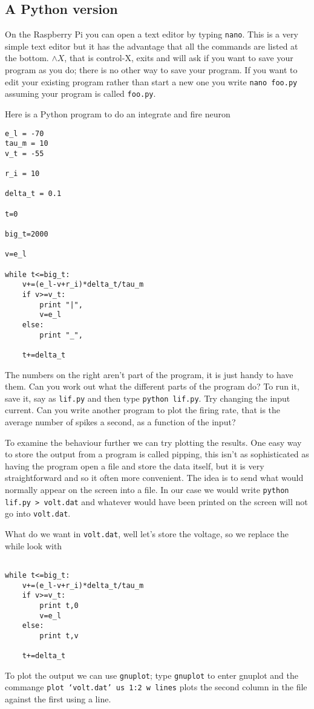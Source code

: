 \documentclass[11pt,a4paper]{scrartcl}
\begin{document}
\newpage

\subsection*{A Python version}

On the Raspberry Pi you can open a text editor by typing
\texttt{nano}. This is a very simple text editor but it has the
advantage that all the commands are listed at the bottom. $\wedge X$, that
is control-X, exits and will ask if you want to save your program as
you do; there is no other way to save your program. If you want to
edit your existing program rather than start a new one you write
\texttt{nano foo.py} assuming your program is called \texttt{foo.py}. 

Here is a Python program to do an integrate and fire neuron
\begin{lstlisting}[numbers=right]
e_l = -70
tau_m = 10
v_t = -55

r_i = 10

delta_t = 0.1

t=0

big_t=2000

v=e_l

while t<=big_t:
	v+=(e_l-v+r_i)*delta_t/tau_m
	if v>=v_t:
		print "|",
		v=e_l	
	else:
		print "_",

	t+=delta_t
\end{lstlisting}
The numbers on the right aren't part of the program, it is just handy
to have them. Can you work out what the different parts of the program
do? To run it, save it, say as \texttt{lif.py} and then type
\texttt{python lif.py}. Try changing the input current. Can you write
another program to plot the firing rate, that is the average number of
spikes a second, as a function of the input?

To examine the behaviour further we can try plotting the results. One
easy way to store the output from a program is called pipping, this
isn't as sophisticated as having the program open a file and store the
data itself, but it is very straightforward and so it often more
convenient. The idea is to send what would normally appear on the
screen into a file. In our case we would write \texttt{python lif.py >
  volt.dat} and whatever would have been printed on the screen will
not go into \texttt{volt.dat}. 

What do we want in \texttt{volt.dat}, well let's store the voltage, so we replace the while look with
\begin{lstlisting}[numbers=right]

while t<=big_t:
	v+=(e_l-v+r_i)*delta_t/tau_m
	if v>=v_t:
		print t,0
		v=e_l	
	else:
		print t,v

	t+=delta_t

\end{lstlisting}

To plot the output we can use \texttt{gnuplot}; type \texttt{gnuplot}
to enter gnuplot and the commange \texttt{plot \lq{}volt.dat\rq{} us
  1:2 w lines} plots the second column in the file against the first
using a line.
\end{document}
